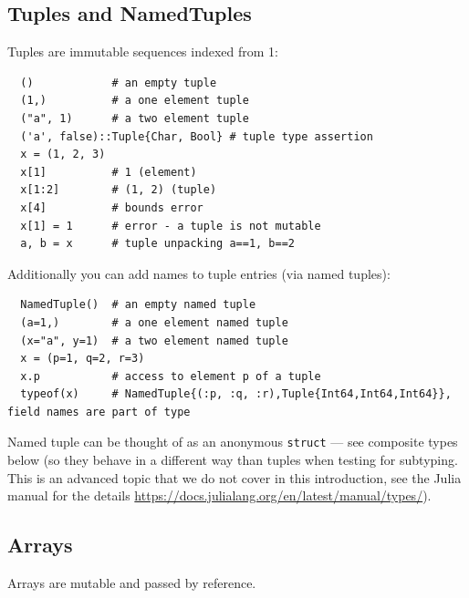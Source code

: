 \documentclass[10pt,a4paper]{article}
\begin{document}
\subsection{Tuples and NamedTuples}
Tuples are immutable sequences indexed from 1:
\begin{lstlisting}
  ()            # an empty tuple
  (1,)          # a one element tuple
  ("a", 1)      # a two element tuple
  ('a', false)::Tuple{Char, Bool} # tuple type assertion
  x = (1, 2, 3)
  x[1]          # 1 (element)
  x[1:2]        # (1, 2) (tuple)
  x[4]          # bounds error
  x[1] = 1      # error - a tuple is not mutable
  a, b = x      # tuple unpacking a==1, b==2
\end{lstlisting}
Additionally you can add names to tuple entries (via named tuples):
\begin{lstlisting}
  NamedTuple()  # an empty named tuple
  (a=1,)        # a one element named tuple
  (x="a", y=1)  # a two element named tuple
  x = (p=1, q=2, r=3)
  x.p           # access to element p of a tuple
  typeof(x)     # NamedTuple{(:p, :q, :r),Tuple{Int64,Int64,Int64}}, field names are part of type
\end{lstlisting}
Named tuple can be thought of as an anonymous \lstinline|struct| --- see composite types below (so they behave in a different way than tuples when testing for subtyping. This is an advanced topic that we do not cover in this introduction, see the Julia manual for the details \url{https://docs.julialang.org/en/latest/manual/types/}).

\subsection{Arrays}
Arrays are mutable and passed by reference.
\end{document}
